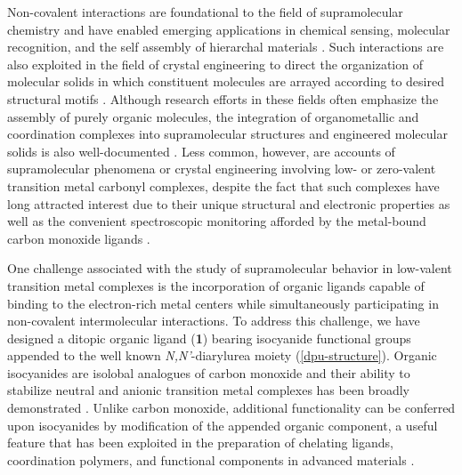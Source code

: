 Non-covalent interactions are foundational to the field of supramolecular chemistry and have enabled emerging applications in chemical sensing, molecular recognition, and the self assembly of hierarchal materials \citep{Varshey2012, Schneider2009, Gale2012}. Such interactions are also exploited in the field of crystal engineering to direct the organization of molecular solids in which constituent molecules are arrayed according to desired structural motifs \citep{Desiraju2007a, Desiraju2013a, Mukherjee2015a, Corpinot2019a}. Although research efforts in these fields often emphasize the assembly of purely organic molecules, the integration of organometallic and coordination complexes into supramolecular structures and engineered molecular solids is also well-documented \citep{Chakrabarty2011, Cook2013a, Datta2018, Tanaka2014, Braga2017}. Less common, however, are accounts of supramolecular phenomena or crystal engineering involving low- or zero-valent transition metal carbonyl complexes, despite the fact that such complexes have long attracted interest due to their unique structural and electronic properties as well as the convenient spectroscopic monitoring afforded by the metal-bound carbon monoxide ligands \citep{Zukerman-Schpector2011, Chang2012a, Ramdass2013a, Ion2007, Coco2009, Karthikeyan2015, Thimmappa1995, Longoni1999}.

One challenge associated with the study of supramolecular behavior in low-valent transition metal complexes is the incorporation of organic ligands capable of binding to the electron-rich metal centers while simultaneously participating in non-covalent intermolecular interactions. To address this challenge, we have designed a ditopic organic ligand (\textbf{1}) bearing isocyanide functional groups appended to the well known \textit{N,N'}-diarylurea moiety (\autoref{dpu-structure}). Organic isocyanides are isolobal analogues of carbon monoxide and their ability to stabilize neutral and anionic transition metal complexes has been broadly demonstrated \citep{Sarapu1972, King1974, Cotton1960, Sarapu1975, Yamamoto1980, Weber1998, Leach1994, Warnock1989}. Unlike carbon monoxide, additional functionality can be conferred upon isocyanides by modification of the appended organic component, a useful feature that has been exploited in the preparation of chelating ligands, coordination polymers, and functional components in advanced materials \citep{Carpenter2016, Hahn1994, Hahn1992, Hahn1992b, Wagner2000, Carson2007, Tannenbaum1994, Carpenter2015a, Angelici2008, Horswell1999}.

